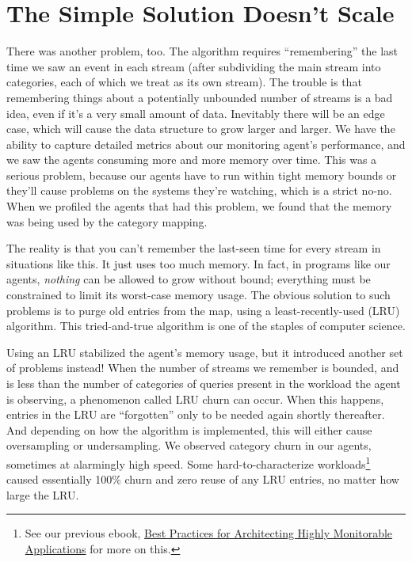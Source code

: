 \documentclass{vivid_layout}
\begin{document}
\section{The Simple Solution Doesn't Scale}

There was another problem, too. The algorithm requires ``remembering'' the last
time we saw an event in each stream (after subdividing the main stream into
categories, each of which we treat as its own stream). The trouble is that
remembering things about a potentially unbounded number of streams is a bad
idea, even if it's a very small amount of data. Inevitably there will be an edge
case, which will cause the data structure to grow larger and larger. We have the
ability to capture detailed metrics about our monitoring agent's performance,
and we saw the agents consuming more and more memory over time.  This was a
serious problem, because our agents have to run within tight memory bounds or
they'll cause problems on the systems they're watching, which is a strict no-no.
When we profiled the agents that had this problem, we found that the memory was
being used by the category mapping.

The reality is that you can't remember the last-seen time for every stream in
situations like this. It just uses too much memory. In fact, in programs like
our agents, \emph{nothing} can be allowed to grow without bound; everything must
be constrained to limit its worst-case memory usage.  The obvious solution to
such problems is to purge old entries from the map, using a least-recently-used
(LRU) algorithm. This tried-and-true algorithm is one of the staples of computer
science.

Using an LRU stabilized the agent's memory usage, but it introduced another set
of problems instead! When the number of streams we remember is bounded, and is
less than the number of categories of queries present in the workload the agent
is observing, a phenomenon called LRU churn can occur. When this happens,
entries in the LRU are ``forgotten'' only to be needed again shortly thereafter.
And depending on how the algorithm is implemented, this will either cause
oversampling or undersampling. We observed category churn in our agents,
sometimes at alarmingly high speed. Some hard-to-characterize
workloads\footnote{See our previous ebook,
\href{https://www.vividcortex.com/resources/architecting-highly-monitorable-apps}{Best
Practices for Architecting Highly Monitorable Applications} for more on this.}
caused essentially 100\% churn and zero reuse of any LRU entries, no matter how
large the LRU.
\end{document}
